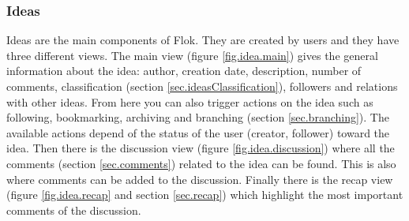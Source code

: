 \documentclass[a4paper,12pt,twoside]{article}
\begin{document}
\subsubsection{Ideas}
Ideas are the main components of Flok.
They are created by users and they have three different views.
The main view (figure \ref{fig.idea.main}) gives the general information about the idea: author, creation date, description, number of comments, classification (section \ref{sec.ideasClassification}), followers and relations with other ideas.
From here you can also trigger actions on the idea such as following, bookmarking, archiving and branching (section \ref{sec.branching}).
The available actions depend of the status of the user (creator, follower) toward the idea.
Then there is the discussion view (figure \ref{fig.idea.discussion}) where all the comments (section \ref{sec.comments}) related to the idea can be found.
This is also where comments can be added to the discussion.
Finally there is the recap view (figure \ref{fig.idea.recap} and section \ref{sec.recap}) which highlight the most important comments of the discussion.
\end{document}
